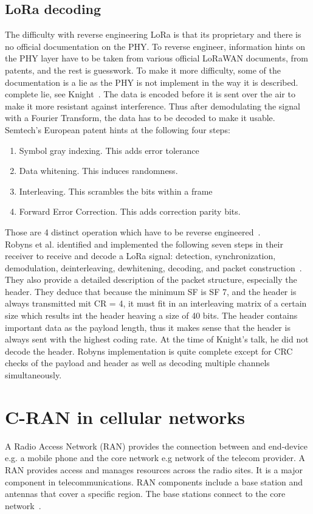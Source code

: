 \section{LoRa decoding}
The difficulty with reverse engineering LoRa is that its proprietary and
there is no official documentation on the PHY. To reverse engineer, information hints
on the PHY layer have to be taken from various official LoRaWAN documents, from patents, and the 
rest is guesswork. To make it more difficulty, some of the documentation is a lie as the PHY is not implement 
in the way it is described. 
complete lie, see Knight~\cite{knight_youtube}. 
The data is encoded before it is sent over the air to make it more resistant against interference.
Thus after demodulating the signal with a Fourier Transform, the data has to be decoded to make it usable.
Semtech's European patent hints at the following four steps:
\begin{enumerate}
    \item Symbol gray indexing. This adds error tolerance
    \item Data whitening. This induces randomness.
    \item Interleaving. This scrambles the bits within a frame
    \item Forward Error Correction. This adds correction parity bits.
    
\end{enumerate}
Those are 4 distinct operation which have to be reverse engineered~\cite{knight_youtube}.\\
Robyns et al. identified and implemented the following seven steps in their receiver to 
receive and decode a LoRa signal: detection, synchronization, demodulation, deinterleaving, dewhitening,
decoding, and packet construction~\cite{robyns_implementation}. They also provide a detailed description of the 
packet structure, especially the header. They deduce that because the minimum SF is SF 7, and the header is always 
transmitted mit CR = 4, it must fit in an interleaving matrix of a certain size which results int the header heaving a size of 
40 bits. The header contains important data as the payload length, thus it makes sense that the header is always sent with the highest
coding rate.
At the time of Knight's talk, he did not decode the header. Robyns implementation is quite complete except for CRC checks of the payload and header
as well as decoding multiple channels simultaneously. 

\chapter{C-RAN in cellular networks}
\label{chap:cran_in_cellular}
A Radio Access Network (RAN) provides the connection between and end-device e.g. a mobile phone and the core network e.g network of the telecom provider.
A RAN provides access and manages resources across the radio sites. It is a major component in telecommunications. RAN components include a base station and antennas
that cover a specific region. The base stations connect to the core network~\cite{what_is_ran}.

